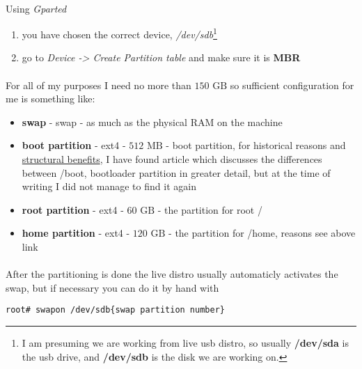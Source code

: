 \documentclass[10pt,a4paper]{article}
\begin{document}
                \paragraph{} Using \textit{Gparted}\begin{enumerate}
                    \item you have chosen the correct device, \textit{/dev/sdb}\footnote{ I am presuming we are working from live usb distro, so usually \textbf{/dev/sda} is the usb drive, and \textbf{/dev/sdb} is the disk we are working on.}
                    \item go to \textit{Device -> Create Partition table} and make sure it is \textbf{MBR}
                \end{enumerate}
                
                \paragraph{} For all of my purposes I need no more than $ 150 \mbox{ GB}$ so sufficient configuration for me is something like: \begin{itemize}
                    \item \textbf{swap} - swap - as much as the physical RAM on the machine 
                    \item \textbf{boot partition} - ext4 - $ 512 \mbox{ MB} $  - boot partition, for historical reasons and \href{https://superuser.com/questions/522971/is-a-boot-partition-always-necessary}{structural benefits}, I have found article which discusses the differences between /boot, bootloader partition in greater detail, but at the time of writing I did not manage to find it again
                    \item \textbf{root partition} - ext4 - $ 60 \mbox{ GB} $ - the partition for root /
                    \item \textbf{home partition} - ext4 - $ 120 \mbox{ GB} $ - the partition for /home, reasons see above link
                \end{itemize}
            
                \paragraph{} After the partitioning is done the live distro usually automaticly activates the swap, but if necessary you can do it by hand with 

\begin{lstlisting}[style=BashInputRoot]
root# swapon /dev/sdb{swap partition number}
\end{lstlisting}
\end{document}
